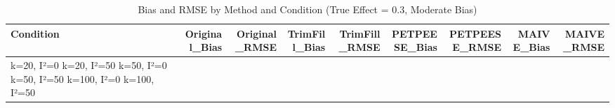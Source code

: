 \begin{table}
\caption{Bias and RMSE by Method and Condition (True Effect = 0.3, Moderate Bias)}
\label{tab:bias_rmse}
\begin{tabular}{lrrrrrrrr}
\toprule
Condition & Original_Bias & Original_RMSE & TrimFill_Bias & TrimFill_RMSE & PETPEESE_Bias & PETPEESE_RMSE & MAIVE_Bias & MAIVE_RMSE \\
\midrule
k=20, I²=0%
k=20, I²=50%
k=50, I²=0%
k=50, I²=50%
k=100, I²=0%
k=100, I²=50%
\bottomrule
\end{tabular}
\end{table}
